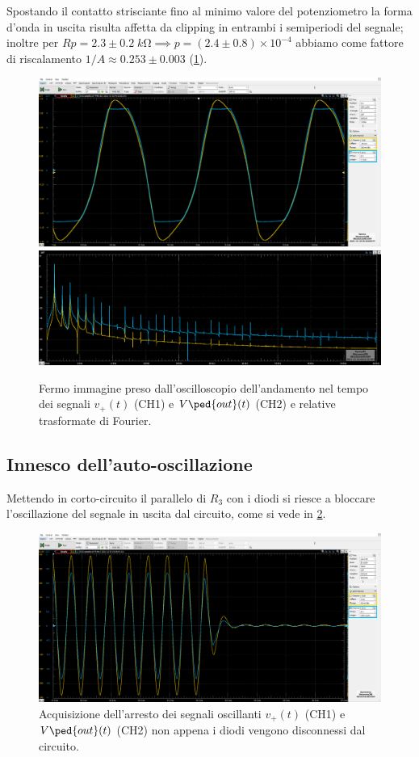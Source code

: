 \documentclass[10pt, a4paper, italian]{article}
\begin{document}
Spostando il contatto strisciante fino al minimo valore del potenziometro
la forma d'onda in uscita risulta affetta da clipping in entrambi i semiperiodi
del segnale; inoltre per
$Rp = 2.3 \pm 0.2 \; \si{k\ohm} \implies p = (2.4 \pm 0.8) \times 10^{-4}$ 
abbiamo come fattore di riscalamento $1/A \approx 0.253 \pm 0.003$
(\cref{fig: Rpmax}).
\begin{figure}[htbp]
	\centering
	\includegraphics[width=\textwidth, height=.25\paperheight]{Rpmax1.5V}
	\includegraphics[width=\textwidth]{Rpmax1.5Vfft}
	\caption{Fermo immagine preso dall'oscilloscopio dell'andamento nel tempo dei
	segnali $v_+ (t)$ (CH1) e $V\ped{out} (t)$ (CH2) e relative trasformate di
	Fourier. \label{fig: Rpmax}}
\end{figure}

\subsection{Innesco dell'auto-oscillazione}
Mettendo in corto-circuito il parallelo di $R_3$ con i diodi si riesce a
bloccare l'oscillazione del segnale in uscita dal circuito, come si vede in
\cref{fig: Rpminstop}.
\begin{figure}[htbp]
	\centering
	\includegraphics[width=\textwidth]{Rpminstop}
	\caption{Acquisizione dell'arresto dei segnali oscillanti $v_+ (t)$ (CH1) e
	$V\ped{out} (t)$ (CH2) non appena i diodi vengono disconnessi dal
	circuito. \label{fig: Rpminstop}}
\end{figure}
\end{document}
